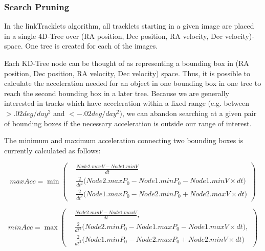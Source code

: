 \subsubsection{Search Pruning}
\label{searchPruning}
In the linkTracklets algorithm, all tracklets starting in a given
image are placed in a single 4D-Tree over (RA position, Dec position,
RA velocity, Dec velocity)-space.  One tree is created for each of the
images.

Each KD-Tree node can be thought of as representing a bounding box in (RA
position, Dec position, RA velocity, Dec velocity) space.  Thus, it is
possible to calculate the acceleration needed for an object in one
bounding box in one tree to reach the second bounding box in a later
tree.  Because we are generally interested in tracks which have
acceleration within a fixed range (e.g. between $>.02 deg/day^2$ and
$<-.02 deg/day^2$), we can abandon searching at a given pair of
bounding boxes if the necessary acceleration is outside our range of
interest.

The minimum and maximum acceleration connecting two bounding boxes is
currently calculated as follows:


\begin{equation}
maxAcc = \min  \left(\begin{array}{ccc} & \displaystyle \frac{Node2.maxV - Node1.minV}{dt} \\
& \displaystyle \frac{2}{dt^2} \bigg(Node2.maxP_0 - Node1.minP_0 - Node1.minV \times dt \bigg) \\
& \displaystyle \frac{2}{dt^2} \bigg(Node1.maxP_0 - Node2.minP_0 + Node2.maxV \times dt \bigg) \end{array}\right)
\label{maxAcc}
\end{equation}

\begin{equation}
minAcc  = \max  \left(\begin{array}{ccc} & \displaystyle \frac{Node2.minV - Node1.maxV}{dt},\\
& \displaystyle \frac{2}{dt^2} \bigg( Node2.minP_0 - Node1.maxP_0 - \displaystyle Node1.maxV \times dt\bigg), \\
& \displaystyle \frac{2}{dt^2} \bigg(Node1.minP_0 - Node2.maxP_0 + Node2.minV \times dt\bigg) \end{array} \right)
\label{minAcc}
\end{equation}



